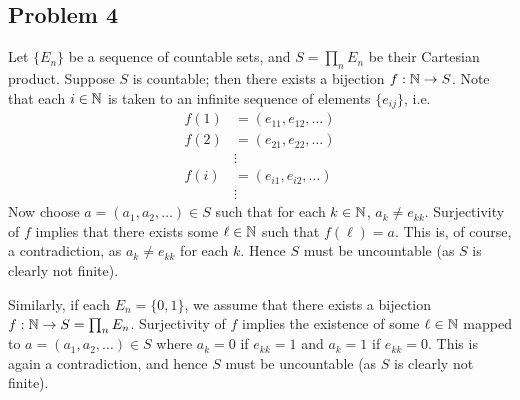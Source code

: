 \documentclass{../mathnotes}
\begin{document}
\subsection*{Problem 4}
Let $\{E_n\}$ be a sequence of countable sets, and $S=\prod_n E_n$ be their Cartesian product. 
Suppose $S$ is countable; then there exists a bijection $f:\mathbb{N}\to S$. Note that each $i\in\mathbb{N}$ is taken
to an infinite sequence of elements $\{e_{ij}\}$, i.e.
\begin{align*}
    f(1) &= (e_{11}, e_{12}, \ldots)\\
    f(2) &= (e_{21}, e_{22}, \ldots)\\
    &\vdots\\
    f(i) &= (e_{i1}, e_{i2}, \ldots)\\
    &\vdots
\end{align*}
Now choose $a=(a_1,a_2,\ldots)\in S$ such that for each $k\in\mathbb{N}$, $a_k\neq e_{kk}$. Surjectivity
of $f$ implies that there exists some $\ell\in\mathbb{N}$ such that $f(\ell)=a$. This is, of course, a contradiction,
as $a_k\neq e_{kk}$ for each $k$. Hence $S$ must be uncountable (as $S$ is clearly not finite).

Similarly, if each $E_n=\{0,1\}$, we assume that there exists a bijection $f:\mathbb{N}\to S=\prod_nE_n$. Surjectivity of
$f$ implies the existence of some $\ell\in\mathbb{N}$ mapped to $a=(a_1,a_2,\ldots)\in S$ where $a_k=0$ if $e_{kk}=1$
and $a_k=1$ if $e_{kk}=0$. This is again a contradiction, and hence $S$ must be uncountable (as $S$ is
clearly not finite).
\end{document}
